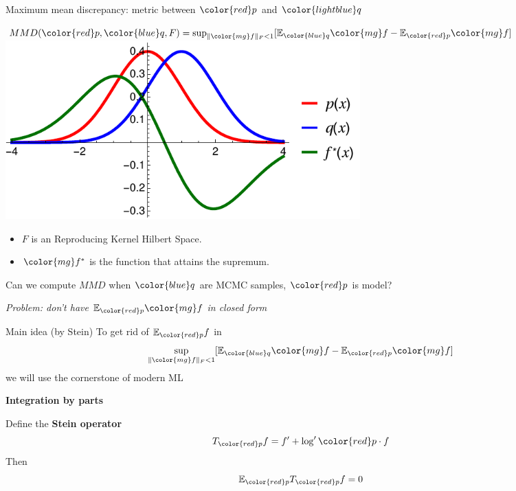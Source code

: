 \documentclass{beamer}
\begin{document}
 \begin{frame}{Maximum mean discrepancy: metric between ${ \color{red} p}$ and ${\color{lightblue} q}$ }
 \begin{center}
$MMD({\color{red} p},{ \color{blue} q},F) = \sup_{   \| {\color{mg}f} \|_F<1} [\ev_{{ \color{blue} q}}{\color{mg}f}- \ev_{{\color{red} p}}{\color{mg} f}]  $\\
\vspace{0.5cm}
 \includegraphics[width=0.6\textwidth]{./img/mmd.pdf} 
 \end{center}
 \begin{itemize}
  \item $F$ is an Reproducing Kernel Hilbert Space.
  \item ${\color{mg} f^*}$ is the function that attains the supremum.
 \end{itemize}

Can we compute $MMD$ when ${\color{blue} q}$ are MCMC samples, ${\color{red} p}$ is model?

\pause

 \vspace{0.1cm}
\begin{center}
 {\large\emph{ {\color{red} Problem:} don't have $\ev_{{\color{red} p}}{\color{mg} f}$ in closed form }}
 \end{center}
 
 \end{frame} 
 
 
 
 \begin{frame}{Main idea (by Stein)}
To get rid of $\ev_{ {\color{red} p} }f$  in $$ \sup_{    \| {\color{mg}f} \|_F<1} [\ev_{{ \color{blue} q}}{\color{mg}f}- \ev_{{\color{red} p}} {\color{mg}f}] $$we will use the cornerstone of modern ML

\pause
\textbf{Integration by parts}




\pause
Define the {\bf Stein operator}
\[
 T_{\color{red} p}f =  f'  +  \log' { \color{red} p} \cdot  f
 \]
 Then
 \[
\ev_{\color{red} p}  T_{\color{red} p} f = 0
 \]
 
 \end{frame}
\end{document}
